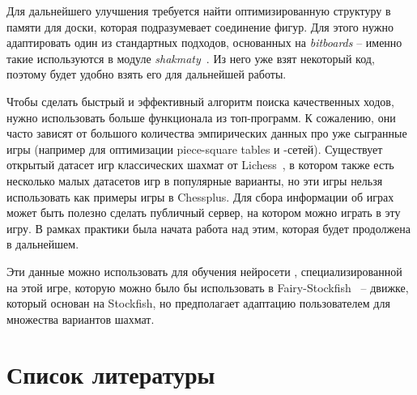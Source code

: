 \documentclass{article}
\begin{document}
Для дальнейшего улучшения требуется найти оптимизированную структуру в памяти для доски,
которая подразумевает соединение фигур.
Для этого нужно адаптировать один из стандартных подходов, основанных на \emph{bitboards} --
именно такие используются в модуле \emph{shakmaty}~\cite{shakmaty-crate}.
Из него уже взят некоторый код,
поэтому будет удобно взять его для дальнейшей работы.

Чтобы сделать быстрый и эффективный алгоритм поиска качественных ходов,
нужно использовать больше функционала из топ-программ.
К сожалению, они часто зависят от большого количества эмпирических данных
про уже сыгранные игры
(например для оптимизации piece-square tables и -сетей).
Существует открытый датасет игр классических шахмат от Lichess~\cite{lichess-dataset},
в котором также есть несколько малых датасетов игр в популярные варианты,
но эти игры нельзя использовать как примеры игры в Chessplus.
Для сбора информации об играх может быть полезно сделать публичный сервер,
на котором можно играть в эту игру.
В рамках практики была начата работа над этим,
которая будет продолжена в дальнейшем.

Эти данные можно использовать для обучения нейросети ,
специализированной на этой игре,
которую можно было бы использовать в Fairy-Stockfish~\cite{fairy-stockfish} --
движке, который основан на Stockfish, но
предполагает адаптацию пользователем для множества вариантов шахмат.


\newpage

\section{Список литературы}

\printbibliography
\end{document}
